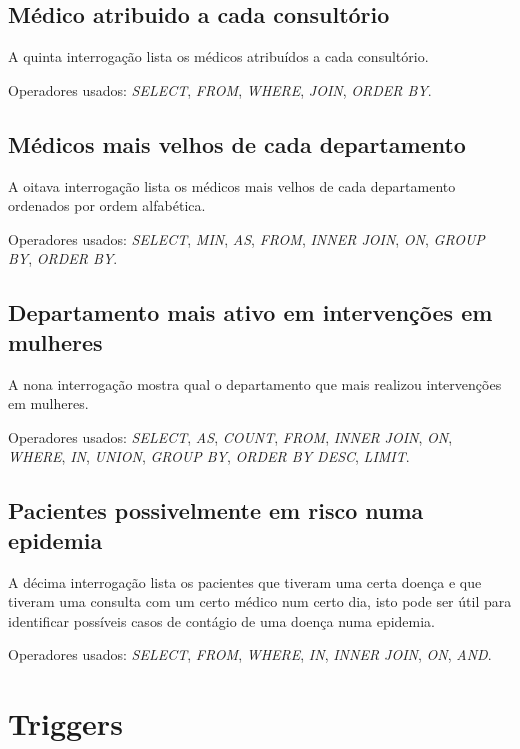 \documentclass[article, a4paper, 12pt, oneside]{memoir}
\begin{document}
\section{Médico atribuido a cada consultório}
A quinta interrogação lista os médicos atribuídos a cada consultório.

Operadores usados: \emph{SELECT}, \emph{FROM}, \emph{WHERE}, \emph{JOIN}, \emph{ORDER BY}.

\section{Médicos mais velhos de cada departamento}
A oitava interrogação lista os médicos mais velhos de cada departamento ordenados por ordem alfabética.

Operadores usados: \emph{SELECT}, \emph{MIN}, \emph{AS}, \emph{FROM}, \emph{INNER JOIN}, \emph{ON}, \emph{GROUP BY}, \emph{ORDER BY}.

\section{Departamento mais ativo em intervenções em mulheres}
A nona interrogação mostra qual o departamento que mais realizou intervenções em mulheres.

Operadores usados: \emph{SELECT}, \emph{AS}, \emph{COUNT}, \emph{FROM}, \emph{INNER JOIN}, \emph{ON}, \emph{WHERE}, \emph{IN}, \emph{UNION}, \emph{GROUP BY}, \emph{ORDER BY DESC}, \emph{LIMIT}.

\section{Pacientes possivelmente em risco numa epidemia}
A décima interrogação lista os pacientes que tiveram uma certa doença e que tiveram uma consulta com um certo médico num certo dia, isto pode ser útil para identificar possíveis casos de contágio de uma doença numa epidemia.

Operadores usados: \emph{SELECT}, \emph{FROM}, \emph{WHERE}, \emph{IN}, \emph{INNER JOIN}, \emph{ON}, \emph{AND}.

\newpage
\chapter[Triggers][Triggers]{Triggers} \label{\thechapter}
\end{document}
